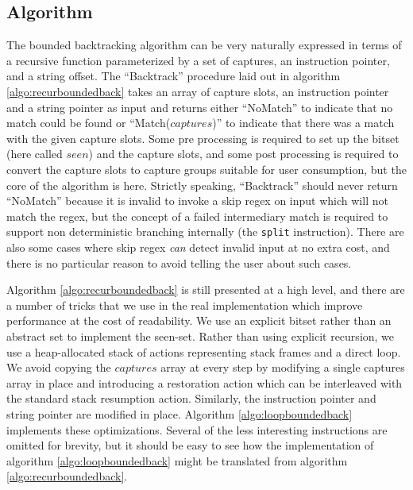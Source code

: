 \subsection{Algorithm}

The bounded backtracking algorithm can be very naturally expressed
in terms of a recursive function parameterized by a set of captures,
an instruction pointer, and a string offset.  The ``Backtrack'' procedure
laid out in algorithm \ref{algo:recurboundedback} takes an array of capture
slots, an instruction pointer and a string pointer as input and returns
either ``NoMatch'' to indicate that no match could be found
or ``Match($captures$)'' to indicate that there was a match with the
given capture slots. Some pre processing is required to
set up the bitset (here called $seen$) and the capture slots,
and some post processing is required to convert the capture slots
to capture groups suitable for user consumption, but the core
of the algorithm is here. Strictly speaking, ``Backtrack'' should
never return ``NoMatch'' because it is invalid to invoke a skip
regex on input which will not match the regex, but the concept of
a failed intermediary match is required to support non deterministic
branching internally (the \verb'split' instruction). There are also
some cases where skip regex \emph{can} detect invalid input at no
extra cost, and there is no particular reason to avoid telling the
user about such cases.

Algorithm \ref{algo:recurboundedback} is still presented at a
high level, and there are a number of tricks that we use in the
real implementation which improve performance at the cost of
readability. We use an explicit bitset rather than an abstract
set to implement the seen-set. Rather than using explicit recursion,
we use a heap-allocated stack of actions representing stack frames
and a direct loop.
We avoid copying the $captures$ array at every step by modifying
a single captures array in place and introducing a restoration action
which can be interleaved with the standard stack resumption action.
Similarly, the instruction pointer and string pointer are modified
in place. Algorithm \ref{algo:loopboundedback} implements these
optimizations. Several of the less interesting instructions are
omitted for brevity, but it should be easy to see how the implementation
of algorithm \ref{algo:loopboundedback}
might be translated from algorithm \ref{algo:recurboundedback}.

